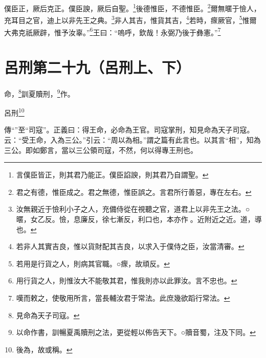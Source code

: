 僕臣正，厥后克正。僕臣諛，厥后自聖。\footnote{言僕臣皆正，則其君乃能正。僕臣諂諛，則其君乃自謂聖。}後德惟臣，不德惟臣。\footnote{君之有德，惟臣成之。君之無德，惟臣誤之。言君所行善惡，專在左右。}爾無暱于憸人，充耳目之官，迪上以非先王之典。\footnote{汝無親近于憸利小子之人，充備侍從在視聽之官，道君上以非先王之法。○暱，女乙反。憸，息廉反，徐七漸反，利口也，本亦作𢘼。近附近之近。道，導也。}非人其吉，惟貨其吉，\footnote{若非人其實吉良，惟以貨財配其吉良，以求入于僕侍之臣，汝當清審。}若時，瘝厥官，\footnote{若用是行貨之人，則病其官職。○瘝，故頑反。}惟爾大弗克祇厥辟，惟予汝辜。”\footnote{用行貨之人，則惟汝大不能敬其君，惟我則亦以此罪汝。言不忠也。}王曰：“嗚呼，欽哉！永弼乃後于彝憲。”\footnote{嘆而敕之，使敬用所言，當長輔汝君于常法。此庶幾欲蹈行常法。}

\section{呂刑第二十九（呂刑上、下）}


命，\footnote{見命為天子司寇。}訓夏贖刑，\footnote{以命作書，訓暢夏禹贖刑之法，更從輕以佈告天下。○贖音蜀，注及下同。}作。

呂刑\footnote{後為，故或稱。}


{\noindent\zhuan{}\fzbyks 傳“”至“司寇”。正義曰：得王命，必命為王官。司寇掌刑，知見命為天子司寇。云：“受王命，入為三公。”引云：“周以為相。”謂之篇有此言也。以其言“相”，知為三公。即如鄭言，當以三公領司寇，不然，何以得專王刑也。 \par}

